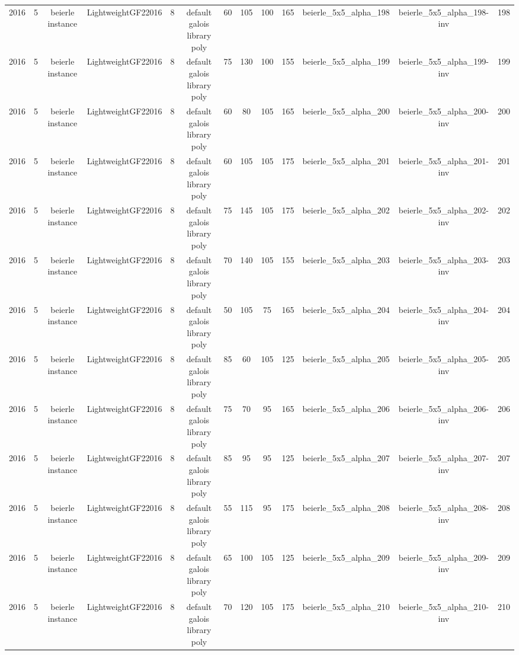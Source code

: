 \begin{tabular}{c c c c c c c c c c c c c}
2016 & 5 & beierle instance & LightweightGF22016 & 8 & default galois library poly & 60 & 105 & 100 & 165 & beierle_5x5_alpha_198 & beierle_5x5_alpha_198-inv & 198 \\
2016 & 5 & beierle instance & LightweightGF22016 & 8 & default galois library poly & 75 & 130 & 100 & 155 & beierle_5x5_alpha_199 & beierle_5x5_alpha_199-inv & 199 \\
2016 & 5 & beierle instance & LightweightGF22016 & 8 & default galois library poly & 60 & 80 & 105 & 165 & beierle_5x5_alpha_200 & beierle_5x5_alpha_200-inv & 200 \\
2016 & 5 & beierle instance & LightweightGF22016 & 8 & default galois library poly & 60 & 105 & 105 & 175 & beierle_5x5_alpha_201 & beierle_5x5_alpha_201-inv & 201 \\
2016 & 5 & beierle instance & LightweightGF22016 & 8 & default galois library poly & 75 & 145 & 105 & 175 & beierle_5x5_alpha_202 & beierle_5x5_alpha_202-inv & 202 \\
2016 & 5 & beierle instance & LightweightGF22016 & 8 & default galois library poly & 70 & 140 & 105 & 155 & beierle_5x5_alpha_203 & beierle_5x5_alpha_203-inv & 203 \\
2016 & 5 & beierle instance & LightweightGF22016 & 8 & default galois library poly & 50 & 105 & 75 & 165 & beierle_5x5_alpha_204 & beierle_5x5_alpha_204-inv & 204 \\
2016 & 5 & beierle instance & LightweightGF22016 & 8 & default galois library poly & 85 & 60 & 105 & 125 & beierle_5x5_alpha_205 & beierle_5x5_alpha_205-inv & 205 \\
2016 & 5 & beierle instance & LightweightGF22016 & 8 & default galois library poly & 75 & 70 & 95 & 165 & beierle_5x5_alpha_206 & beierle_5x5_alpha_206-inv & 206 \\
2016 & 5 & beierle instance & LightweightGF22016 & 8 & default galois library poly & 85 & 95 & 95 & 125 & beierle_5x5_alpha_207 & beierle_5x5_alpha_207-inv & 207 \\
2016 & 5 & beierle instance & LightweightGF22016 & 8 & default galois library poly & 55 & 115 & 95 & 175 & beierle_5x5_alpha_208 & beierle_5x5_alpha_208-inv & 208 \\
2016 & 5 & beierle instance & LightweightGF22016 & 8 & default galois library poly & 65 & 100 & 105 & 125 & beierle_5x5_alpha_209 & beierle_5x5_alpha_209-inv & 209 \\
2016 & 5 & beierle instance & LightweightGF22016 & 8 & default galois library poly & 70 & 120 & 105 & 175 & beierle_5x5_alpha_210 & beierle_5x5_alpha_210-inv & 210 \\

\end{tabular}
